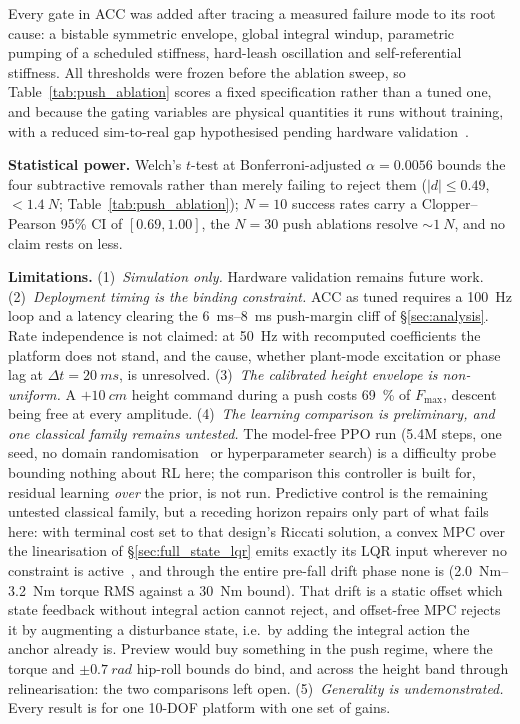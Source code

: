 \documentclass{jcd}
\begin{document}
Every gate in ACC was added after tracing a measured failure mode to its root cause: a bistable symmetric envelope, global integral
windup, parametric pumping of a scheduled stiffness, hard-leash oscillation and
self-referential stiffness. All thresholds were frozen before the ablation
sweep, so Table~\ref{tab:push_ablation} scores a fixed specification rather than a tuned one, and because the gating variables are physical quantities it runs without training, with a reduced sim-to-real gap hypothesised pending hardware validation~\citep{grimminger2020torque}.

\textbf{Statistical power.} Welch's $t$-test at Bonferroni-adjusted
$\alpha{=}0.0056$ bounds the four subtractive removals rather than merely failing
to reject them ($|d|{\le}0.49$, ${<}\SI{1.4}{N}$; Table~\ref{tab:push_ablation});
$N{=}10$ success rates carry a Clopper--Pearson 95\% CI of $[0.69,1.00]$, the
$N{=}30$ push ablations resolve ${\sim}\SI{1}{N}$, and no claim rests on less.

\textbf{Limitations.}
(1)~\emph{Simulation only.} Hardware validation remains future work.
(2)~\emph{Deployment timing is the binding constraint.} ACC as tuned requires a \SI{100}{Hz} loop and a latency clearing the \SIrange{6}{8}{ms} push-margin cliff of \S\ref{sec:analysis}. Rate independence is not claimed: at \SI{50}{Hz} with recomputed coefficients the platform does not stand, and the cause, whether plant-mode excitation or phase lag at $\Delta t{=}\SI{20}{ms}$, is unresolved.
(3)~\emph{The calibrated height envelope is non-uniform.} A ${+}\SI{10}{cm}$
height command during a push costs \SI{69}{\percent} of $F_{\max}$, descent
being free at every amplitude.
(4)~\emph{The learning comparison is preliminary, and one classical family remains untested.} The model-free PPO run (5.4M steps, one seed, no domain
randomisation~\citep{tobin2017domainrand} or hyperparameter search) is a
difficulty probe bounding nothing about RL here; the comparison this controller is built for, residual learning \emph{over} the prior, is not run. Predictive control is the remaining untested
classical family, but a receding horizon repairs only part of what fails here:
with terminal cost set to that design's Riccati solution, a convex MPC over the
linearisation of \S\ref{sec:full_state_lqr} emits exactly its LQR input wherever
no constraint is active~\citep{rawlings2017mpc}, and through the entire pre-fall
drift phase none is (\SIrange{2.0}{3.2}{Nm} torque RMS against a \SI{30}{Nm}
bound). That drift is a static offset which state feedback without integral
action cannot reject, and offset-free MPC rejects it by augmenting a disturbance state, i.e.\ by adding the integral action the anchor already is. Preview would
buy something in the push regime, where the torque and $\pm\SI{0.7}{rad}$
hip-roll bounds do bind, and across the height band through relinearisation:
the two comparisons left open.
(5)~\emph{Generality is undemonstrated.} Every result is for one 10-DOF
platform with one set of gains.
\end{document}
